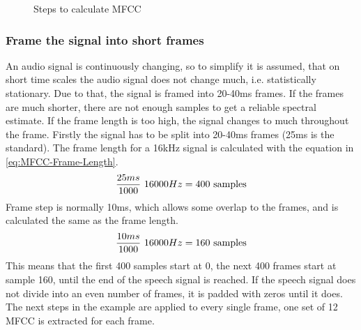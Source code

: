 \begin{figure}[htbp]
	\centering
    \caption[Steps to calculate MFCC]{Steps to calculate MFCC \footnotemark}
    \label{fig:MFCC-Overview}
\end{figure}

\subsubsection{Frame the signal into short frames}
An audio signal is continuously changing, so to simplify it is assumed, that on short time scales the audio signal does not change much, i.e. statistically stationary. Due to that, the signal is framed into 20-40ms frames. If the frames are much shorter, there are not enough samples to get a reliable spectral estimate. If the frame length is too high, the signal changes to much throughout the frame.
\newline 
\newline
Firstly the signal has to be split into 20-40ms frames (25ms is the standard). The frame length for a 16kHz signal is calculated with the equation in \ref{eq:MFCC-Frame-Length}. 
\begin{equation}
    \centering
    \frac{25ms}{1000} \ 16000Hz = 400 \ \text{samples}
    \label{eq:MFCC-Frame-Length}
\end{equation}
Frame step is normally 10ms, which allows some overlap to the frames, and is calculated the same as the frame length.
\begin{equation}
    \centering
    \frac{10ms}{1000} \ 16000Hz = 160 \ \text{samples}
    \label{eq:MFCC-Frame-Step}
\end{equation}
This means that the first 400 samples start at 0, the next 400 frames start at sample 160, until the end of the speech signal is reached. If the speech signal does not divide into an even number of frames, it is padded with zeros until it does. The next steps in the example are applied to every single frame, one set of 12 \gls{MFCC} is extracted for each frame.

